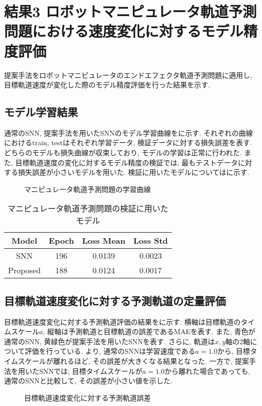 \section{結果3 ロボットマニピュレータ軌道予測問題における速度変化に対するモデル精度評価} \label{sec:result3}
提案手法をロボットマニピュレータのエンドエフェクタ軌道予測問題に適用し, 目標軌道速度が変化した際のモデル精度評価を行った結果を示す.

\subsection{モデル学習結果}
通常のSNN, 提案手法を用いたSNNのモデル学習曲線をに示す.
それぞれの曲線におけるtrain, testはそれぞれ学習データ, 検証データに対する損失誤差を表す.
どちらのモデルも損失曲線が収束しており, モデルの学習は正常に行われた.
また, 目標軌道速度の変化に対するモデル精度の検証では, 最もテストデータに対する損失誤差が小さいモデルを用いた.
検証に用いたモデルについてはに示す.
\begin{figure}[htb]
    \centering
    
    \caption{マニピュレータ軌道予測問題の学習曲線}
    \label{fig:result3:losscurve}
\end{figure}

\begin{table}[htb]
    \centering
    \caption{マニピュレータ軌道予測問題の検証に用いたモデル}
    \label{tab:result3:model:parameter}
    \begin{tabular}{cccc}
        \hline
        \textbf{Model}& \textbf{Epoch} & \textbf{Loss Mean} & \textbf{Loss Std}\\
        \hline
        SNN &  196 & 0.0139 & 0.0023\\ %
        Proposed & 188 & 0.0124 & 0.0017\\
        \hline
    \end{tabular}
\end{table}
\clearpage


\subsection{目標軌道速度変化に対する予測軌道の定量評価}
目標軌道速度変化に対する予測軌道評価の結果をに示す.
横軸は目標軌道のタイムスケール$a$, 縦軸は予測軌道と目標軌道の誤差であるMAEを表す.
また, 青色が通常のSNN, 黄緑色が提案手法を用いたSNNを表す.
さらに, 軌道は$x, y$軸の2軸について評価を行っている.
より, 通常のSNNは学習速度である$a=1.0$から, 目標タイムスケールが離れるほど, その誤差が大きくなる結果となった.
一方で, 提案手法を用いたSNNでは, 目標タイムスケールが$a=1.0$から離れた場合であっても, 通常のSNNと比較して, その誤差が小さい値を示した.
\begin{figure}[htb]
    \centering
    
    \caption{目標軌道速度変化に対する予測軌道誤差}
    \label{fig:result3:trjerror}
\end{figure}


